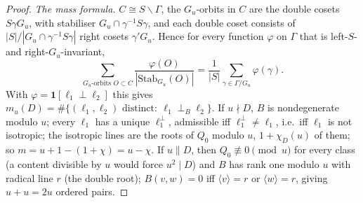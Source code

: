 \documentclass[11pt,a4paper]{article}
\theoremstyle{remark}\newtheorem{remark}[theorem]{Remark}
\begin{document}
\begin{proof}
\emph{The mass formula.} $C\cong S\backslash\Gamma$, the $G_u$-orbits in $C$ are the double cosets $S\gamma G_u$, with stabiliser
$G_u\cap\gamma^{-1}S\gamma$, and each double coset consists of $|S|/|G_u\cap\gamma^{-1}S\gamma|$ right cosets $\gamma'G_u$. Hence for
every function $\varphi$ on $\Gamma$ that is left-$S$- and right-$G_u$-invariant,
\begin{equation}\label{eq:mass}
\sum_{\text{$G_u$-orbits }O\subset C}\frac{\varphi(O)}{|\mathrm{Stab}_{G_u}(O)|}=\frac1{|S|}\sum_{\gamma\in\Gamma/G_u}\varphi(\gamma).
\end{equation}
With $\varphi=\mathbf 1[\ell_1\perp\ell_2]$ this gives $m_u(D)=\#\{(\ell_1,\ell_2)\text{ distinct}:\ \ell_1\perp_B\ell_2\}$. If
$u\nmid D$, $B$ is nondegenerate modulo $u$; every $\ell_1$ has a unique $\ell_1^\perp$, admissible iff $\ell_1^\perp\ne\ell_1$, i.e.\ iff
$\ell_1$ is not isotropic; the isotropic lines are the roots of $Q_0$ modulo $u$, $1+\chi_D(u)$ of them; so $m=u+1-(1+\chi)=u-\chi$.
If $u\parallel D$, then $Q_0\not\equiv0\pmod u$ for every class (a content divisible by $u$ would force $u^2\mid D$) and $B$ has rank one modulo $u$ with radical line $r$
(the double root); $B(v,w)=0$ iff $\langle v\rangle=r$ or $\langle w\rangle=r$, giving $u+u=2u$ ordered pairs.
\end{proof}
\end{document}
